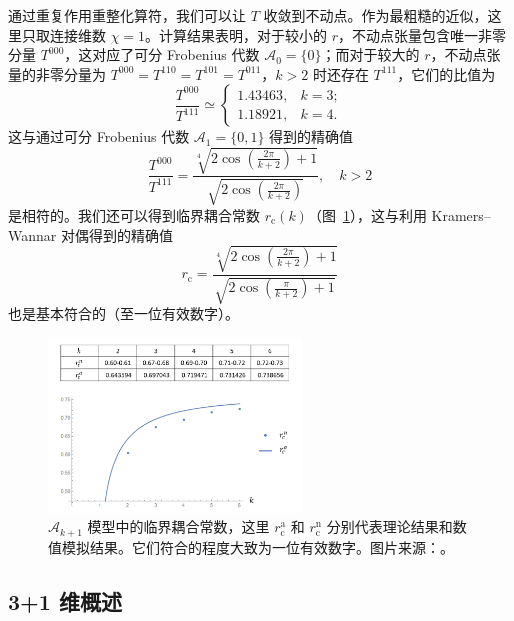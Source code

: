 通过重复作用重整化算符，我们可以让 $T$ 收敛到不动点。作为最粗糙的近似，这里只取连接维数 $\chi=1$。计算结果表明，对于较小的 $r$，不动点张量包含唯一非零分量 $T^{000}$，这对应了可分 Frobenius 代数 $\mathcal{A}_0=\{0\}$；而对于较大的 $r$，不动点张量的非零分量为 $T^{000}=T^{110}=T^{101}=T^{011}$，$k>2$ 时还存在 $T^{111}$，它们的比值为
\begin{equation}
  \frac{T^{000}}{T^{111}} \simeq \begin{cases}
    1.43463, & k = 3; \\
    1.18921, & k = 4.
  \end{cases}
\end{equation}
这与通过可分 Frobenius 代数 $\mathcal{A}_1=\{0,1\}$ 得到的精确值
\begin{equation}
  \frac{T^{000}}{T^{111}} = \frac{\sqrt[4]{2\cos\left(\frac{2\pi}{k+2}\right) + 1}}{\sqrt{2\cos\left(\frac{2\pi}{k+2}\right)}}, \quad
  k > 2
\end{equation}
是相符的。我们还可以得到临界耦合常数 $r_{\text{c}}(k)$（图~\ref{fig:a-k+1-coupling}），这与利用 Kramers--Wannar 对偶得到的精确值
\begin{equation}
  r_{\text{c}} = \frac{\sqrt[4]{2\cos\left(\frac{2\pi}{k+2}\right) + 1}}{\sqrt{2\cos\left(\frac{\pi}{k+2}\right) + 1}}
\end{equation}
也是基本符合的（至一位有效数字）。

\begin{figure}[htb]
  \centering
  \includegraphics[width=0.6\textwidth]{images/holographic/a-k+1-coupling.png}
  \caption[$\mathcal{A}_{k+1}$ 模型中的临界耦合常数]{$\mathcal{A}_{k+1}$ 模型中的临界耦合常数，这里 $r^{\text{a}}_{\text{c}}$ 和 $r^{\text{n}}_{\text{c}}$ 分别代表理论结果和数值模拟结果。它们符合的程度大致为一位有效数字。图片来源：\parencite{chen2022exact}。}
  \label{fig:a-k+1-coupling}
\end{figure}

\subsection{3+1 维概述}

